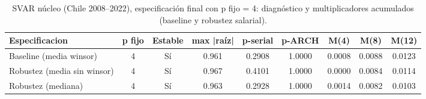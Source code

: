 \begin{table}[htbp]
\centering
\caption{SVAR núcleo (Chile 2008--2022), especificación final con p fijo = 4: diagnóstico y multiplicadores acumulados (baseline y robustez salarial).}
\label{tab:svar_core_p4_fixed_summary}
\footnotesize
\begin{tabular}{lcccccccc}
\toprule
Especificacion & p fijo & Estable & max |raíz| & p-serial & p-ARCH & M(4) & M(8) & M(12) \\
\midrule
Baseline (media winsor) & 4 & Sí & 0.961 & 0.2908 & 1.0000 & 0.0008 & 0.0088 & 0.0123 \\
Robustez (media sin winsor) & 4 & Sí & 0.967 & 0.4101 & 1.0000 & 0.0000 & 0.0084 & 0.0114 \\
Robustez (mediana) & 4 & Sí & 0.963 & 0.2928 & 1.0000 & 0.0014 & 0.0082 & 0.0103 \\
\bottomrule
\end{tabular}
\end{table}

